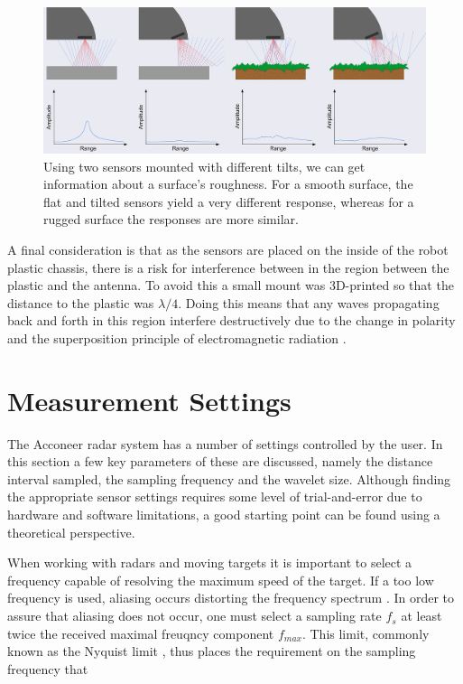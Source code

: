 \begin{figure}[h]
	\centering
	\includegraphics[scale=0.9]{figs_temp/reflections.jpg}
	\caption{Using two sensors mounted with different tilts, we can get information about a surface's roughness. For a smooth surface, the flat and tilted sensors yield a very different response, whereas for a rugged surface the responses are more similar.}
	\label{fig:reflections}
\end{figure}

A final consideration is that as the sensors are placed on the inside of the robot plastic chassis, there is a risk for interference between in the region between the plastic and the antenna. To avoid this a small mount was 3D-printed so that the distance to the plastic was $\lambda/4$. Doing this means that any waves propagating back and forth in this region interfere destructively due to the change in polarity and the superposition principle of electromagnetic radiation \citep{griffiths_2018}.

\section{Measurement Settings}

The Acconeer radar system has a number of settings controlled by the user. In this section a few key parameters of these are discussed, namely the distance interval sampled, the sampling frequency and the wavelet size. Although finding the appropriate sensor settings requires some level of trial-and-error due to hardware and software limitations, a good starting point can be found using a theoretical perspective. 


When working with radars and moving targets it is important to select a frequency capable of resolving the maximum speed of the target. If a too low frequency is used, aliasing occurs distorting the frequency spectrum \citep{lindgren_rootzeŽn_sandsten_2013}. In order to assure that aliasing does not occur, one must select a sampling rate $f_s$ at least twice the received maximal freuqncy component $f_{max}$. This limit, commonly known as the Nyquist limit \citep{proakis_manolakis_1995}, thus places the requirement on the sampling frequency that 

